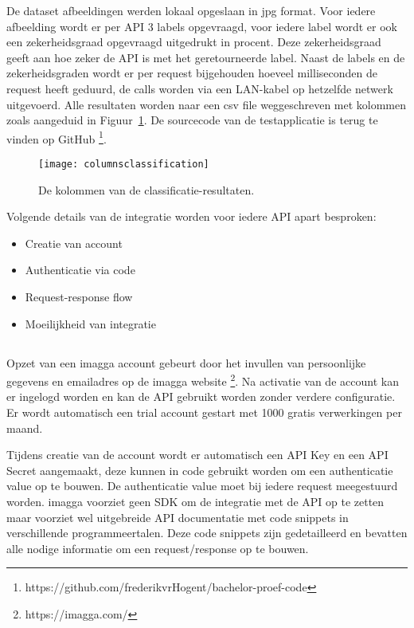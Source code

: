 De dataset afbeeldingen werden lokaal opgeslaan in jpg format. Voor iedere afbeelding wordt er per API 3 labels opgevraagd, voor iedere label wordt er ook een zekerheidsgraad opgevraagd uitgedrukt in procent. Deze zekerheidsgraad geeft aan hoe zeker de API is met het geretourneerde label. Naast de labels en de zekerheidsgraden wordt er per request bijgehouden hoeveel milliseconden de request heeft geduurd, de calls worden via een LAN-kabel op hetzelfde netwerk uitgevoerd. Alle resultaten worden naar een csv file weggeschreven met kolommen zoals aangeduid in Figuur~\ref{fig:columnsclassification}. De sourcecode van de testapplicatie is terug te vinden op GitHub \footnote{https://github.com/frederikvrHogent/bachelor-proef-code}.

\begin{figure}
    \centering
    \texttt{[image: columnsclassification]}
    \caption{De kolommen van de classificatie-resultaten.}
    \label{fig:columnsclassification}
\end{figure}

Volgende details van de integratie worden voor iedere API apart besproken:
 \begin{itemize}
    \item Creatie van account
    \item Authenticatie via code
    \item Request-response flow
    \item Moeilijkheid van integratie
\end{itemize}

\subsection{}
\label{sec:integration-imagga}
Opzet van een imagga account gebeurt door het invullen van persoonlijke gegevens en emailadres op de imagga website \footnote{https://imagga.com/}. Na activatie van de account kan er ingelogd worden en kan de API gebruikt worden zonder verdere configuratie. Er wordt automatisch een trial account gestart met 1000 gratis verwerkingen per maand.

Tijdens creatie van de account wordt er automatisch een API Key en een API Secret aangemaakt, deze kunnen in code gebruikt worden om een authenticatie value op te bouwen. De authenticatie value moet bij iedere request meegestuurd worden. imagga voorziet geen SDK om de integratie met de API op te zetten maar voorziet wel uitgebreide API documentatie met code snippets in verschillende programmeertalen. Deze code snippets zijn gedetailleerd en bevatten alle nodige informatie om een request/response op te bouwen.

